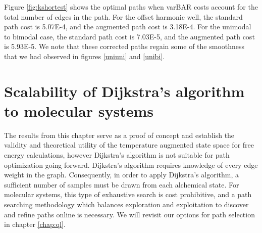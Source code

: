 Figure \ref{fig:kshortest} shows the optimal paths when varBAR costs account for the total number of edges in the path. 
For the offset harmonic well, the standard path cost is 5.07E-4, and the augmented path cost is 3.18E-4. 
For the unimodal to bimodal case, the standard path cost is 7.03E-5, and the augmented path cost is 5.93E-5.
We note that these corrected paths regain some of the smoothness that we had observed in figures \ref{uniuni} and \ref{unibi}.


\section{Scalability of Dijkstra's algorithm to molecular systems}

The results from this chapter serve as a proof of concept and establish the validity and theoretical utility of the temperature augmented state space for free energy calculations, however Dijkstra's algorithm is not suitable for path optimization going forward.
Dijkstra's algorithm requires knowledge of every edge weight in the graph.
Consequently, in order to apply Dijkstra's algorithm, a sufficient number of samples must be drawn from each alchemical state.
For molecular systems, this type of exhaustive search is cost prohibitive, and a path searching methodology which balances exploration and exploitation to discover and refine paths online is necessary. 
We will revisit our options for path selection in chapter \ref{chap:ql}.


